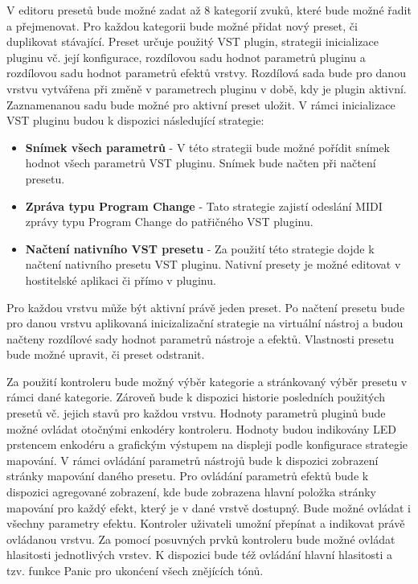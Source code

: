\documentclass[thesis=M,czech]{FITthesis}[2019/03/06]
\begin{document}
		V editoru presetů bude možné zadat až 8 kategorií zvuků, které bude možné řadit a přejmenovat.
		Pro každou kategorii bude možné přidat nový preset, či duplikovat stávající. Preset určuje použitý VST plugin,
		strategii inicializace pluginu vč. její konfigurace, rozdílovou sadu hodnot parametrů pluginu a rozdílovou sadu hodnot parametrů efektů vrstvy.
		Rozdílová sada bude pro danou vrstvu vytvářena při změně v parametrech pluginu v době, kdy je plugin aktivní. Zaznamenanou sadu bude možné pro aktivní preset uložit.
		V rámci inicializace VST pluginu budou k dispozici následující strategie:
		\begin{itemize}
			\item \textbf{Snímek všech parametrů} - V této strategii bude možné pořídit snímek hodnot všech parametrů VST pluginu. Snímek bude načten při načtení presetu.
			\item \textbf{Zpráva typu Program Change} - Tato strategie zajistí odeslání MIDI zprávy typu Program Change do patřičného VST pluginu.
			\item \textbf{Načtení nativního VST presetu} - Za použití této strategie dojde k načtení nativního presetu VST pluginu. Nativní presety je možné editovat
			v hostitelské aplikaci či přímo v pluginu.
		\end{itemize}
		Pro každou vrstvu může být aktivní právě jeden preset. Po načtení presetu bude 
		pro danou vrstvu aplikovaná inicizalizační strategie na virtuální nástroj a budou načteny rozdílové sady hodnot parametrů nástroje a efektů.
		Vlastnosti presetu bude možné upravit, či preset odstranit.
	
		Za použití kontroleru bude možný výběr kategorie a stránkovaný výběr presetu v rámci dané kategorie. Zároveň bude k dispozici
		historie posledních použitých presetů vč. jejich stavů pro každou vrstvu.
		Hodnoty parametrů pluginů bude možné ovládat otočnými enkodéry kontroleru. Hodnoty budou indikovány LED prstencem enkodéru a grafickým výstupem na displeji podle konfigurace strategie mapování.
		V rámci ovládání parametrů nástrojů bude k dispozici
		zobrazení stránky mapování daného presetu. Pro ovládání parametrů efektů bude k dispozici agregované zobrazení, kde bude zobrazena
		hlavní položka stránky mapování pro každý efekt, který je v dané vrstvě dostupný. Bude možné ovládat i všechny parametry efektu.
		Kontroler uživateli umožní přepínat a indikovat právě ovládanou vrstvu. 
		Za pomocí posuvných prvků kontroleru bude možné ovládat hlasitosti jednotlivých vrstev.
		K dispozici bude též ovládání hlavní hlasitosti a tzv. funkce Panic pro ukonćení všech znějících tónů.
	
\end{document}
